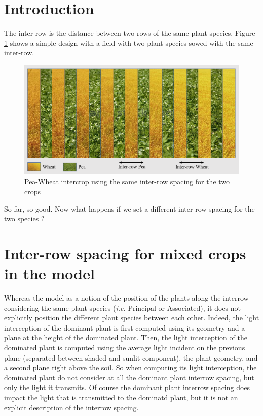 \documentclass[]{book}
\theoremstyle{definition}
\theoremstyle{definition}
\theoremstyle{definition}
\theoremstyle{remark}
\begin{document}
\section{Introduction}\label{introduction-3}

The inter-row is the distance between two rows of the same plant
species. Figure \ref{fig:SameInterrow} shows a simple design with a
field with two plant species sowed with the same inter-row.

\begin{figure}
\centering
\includegraphics{img/Same-Interrow.png}
\caption{\label{fig:SameInterrow}Pea-Wheat intercrop using the same
inter-row spacing for the two crops}
\end{figure}

So far, so good. Now what happens if we set a different inter-row
spacing for the two species ?

\section{Inter-row spacing for mixed crops in the
model}\label{inter-row-spacing-for-mixed-crops-in-the-model}

Whereas the model as a notion of the position of the plants along the
interrow considering the same plant species (\emph{i.e.} Principal or
Associated), it does not explicitly position the different plant species
between each other. Indeed, the light interception of the dominant plant
is first computed using its geometry and a plane at the height of the
dominated plant. Then, the light interception of the dominated plant is
computed using the average light incident on the previous plane
(separated between shaded and sunlit component), the plant geometry, and
a second plane right above the soil. So when computing its light
interception, the dominated plant do not consider at all the dominant
plant interrow spacing, but only the light it transmits. Of course the
dominant plant interrow spacing does impact the light that is
transmitted to the dominatd plant, but it is not an explicit description
of the interrow spacing.
\end{document}
